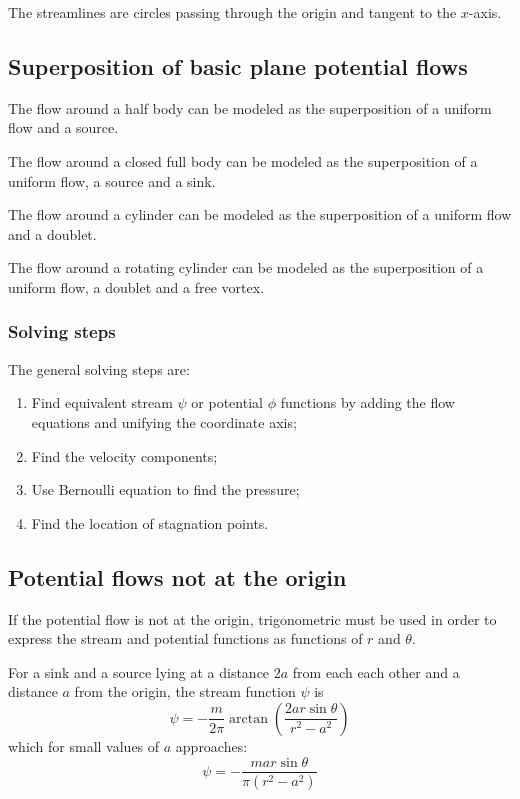 \documentclass[10pt, twocolumn]{article}
\begin{document}
\begin{remark}
  The streamlines are circles passing through the origin and tangent to the \(x\)-axis.
\end{remark}


\subsection{Superposition of basic plane potential flows}
The flow around a half body can be modeled as the superposition of a uniform flow and a source.

The flow around a closed full body can be modeled as the superposition of a uniform flow, a source and a sink.

The flow around a cylinder can be modeled as the superposition of a uniform flow and a doublet.

The flow around a rotating cylinder can be modeled as the superposition of a uniform flow, a doublet and a free vortex.


\subsubsection{Solving steps}
The general solving steps are:
\begin{enumerate}
  \item Find equivalent stream \(\psi\) or potential \(\phi\) functions by adding the flow equations and unifying the coordinate axis;
  \item Find the velocity components;
  \item Use Bernoulli equation to find the pressure;
  \item Find the location of stagnation points.
\end{enumerate}


\subsection{Potential flows not at the origin}
If the potential flow is not at the origin, trigonometric must be used in order to express the stream and potential functions as functions of \(r\) and \(\theta\).

For a sink and a source lying at a distance \(2a\) from each each other and a distance \(a\) from the origin, the stream function \(\psi\) is
\[
  \psi = -\frac{m}{2\pi} \arctan \left( \frac{2ar\sin\theta}{r^2 - a^2} \right)
\]
which for small values of \(a\) approaches:
\[
  \psi = -\frac{mar\sin\theta}{\pi\left( r^2 - a^2 \right)}
\]
\end{document}
